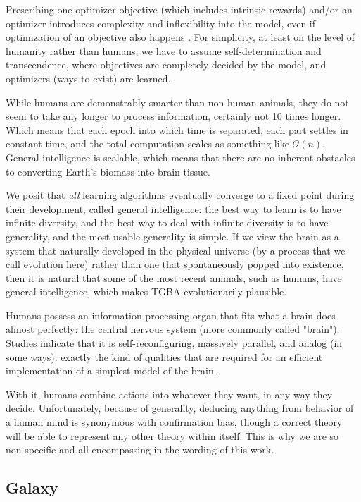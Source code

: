 \documentclass{article}
\begin{document}
Prescribing one optimizer objective (which includes intrinsic rewards) and/or an optimizer introduces complexity and inflexibility into the model, even if optimization of an objective also happens \cite{Dabney2020}. For simplicity, at least on the level of humanity rather than humans, we have to assume self-determination and transcendence, where objectives are completely decided by the model, and optimizers (ways to exist) are learned.

While humans are demonstrably smarter than non-human animals, they do not seem to take any longer to process information, certainly not 10 times longer. Which means that each epoch into which time is separated, each part settles in constant time, and the total computation scales as something like $\mathcal{O}(n)$. General intelligence is scalable, which means that there are no inherent obstacles to converting Earth's biomass into brain tissue.

We posit that \textit{all} learning algorithms eventually converge to a fixed point during their development, called general intelligence: the best way to learn is to have infinite diversity, and the best way to deal with infinite diversity is to have generality, and the most usable generality is simple. If we view the brain as a system that naturally developed in the physical universe (by a process that we call evolution here) rather than one that spontaneously popped into existence, then it is natural that some of the most recent animals, such as humans, have general intelligence, which makes TGBA evolutionarily plausible.

Humans possess an information-processing organ that fits what a brain does almost perfectly: the central nervous system (more commonly called "brain"). Studies indicate that it is self-reconfiguring, massively parallel, and analog (in some ways): exactly the kind of qualities that are required for an efficient implementation of a simplest model of the brain.

With it, humans combine actions into whatever they want, in any way they decide. Unfortunately, because of generality, deducing anything from behavior of a human mind is synonymous with confirmation bias, though a correct theory will be able to represent any other theory within itself. This is why we are so non-specific and all-encompassing in the wording of this work.

\subsection{Galaxy}
\end{document}
